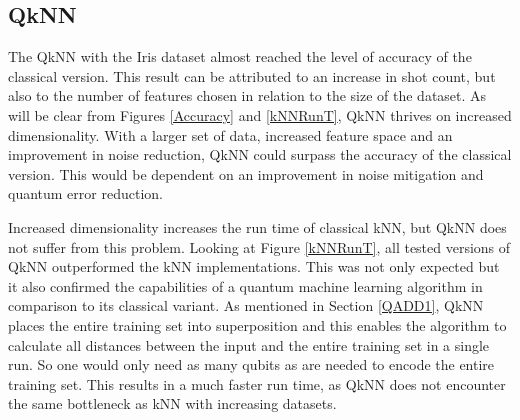 \subsection{QkNN}
The QkNN with the Iris dataset almost reached the level of accuracy of the classical version. This result can be attributed to an increase in shot count, but also to the number of features chosen in relation to the size of the dataset. As will be clear from Figures \ref{Accuracy} and \ref{kNNRunT}, QkNN thrives on increased dimensionality.
With a larger set of data, increased feature space and an improvement in noise reduction, QkNN could surpass the accuracy of the classical version. This would be  dependent on an improvement in noise mitigation and quantum error reduction.


Increased dimensionality increases the run time of classical kNN, but QkNN does not suffer from this problem.
Looking at Figure \ref{kNNRunT}, all tested versions of QkNN outperformed the kNN implementations. This was not only expected but it also confirmed the capabilities of a quantum machine learning algorithm in comparison to its classical variant. As mentioned in Section \ref{QADD1}, QkNN places the entire training set into superposition and this enables the algorithm to calculate all distances between the input and the entire training set in a single run. So one would only need as many qubits as are needed to encode the entire training set. This results in a much faster run time, as QkNN does not encounter the same bottleneck as kNN with increasing datasets. 

